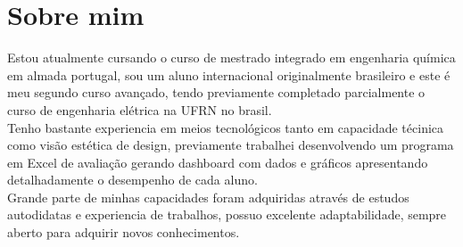 \documentclass[letterpaper]{twentysecondcv} %
\begin{document}

\aboutme{} %





\skillstext{}


\makeprofile %


\section{Sobre mim}

Estou atualmente cursando o curso de mestrado integrado em engenharia química em almada portugal, sou um aluno internacional originalmente brasileiro e este é meu segundo curso avançado, tendo previamente completado parcialmente o curso de engenharia elétrica na UFRN no brasil.\\

Tenho bastante experiencia em meios tecnológicos tanto em capacidade técinica como visão estética de design, previamente trabalhei desenvolvendo um programa em Excel de avaliação gerando dashboard com dados e gráficos apresentando detalhadamente o desempenho de cada aluno.\\

Grande parte de minhas capacidades foram adquiridas através de estudos autodidatas e experiencia de trabalhos, possuo excelente adaptabilidade, sempre aberto para adquirir novos conhecimentos.
\end{document}
